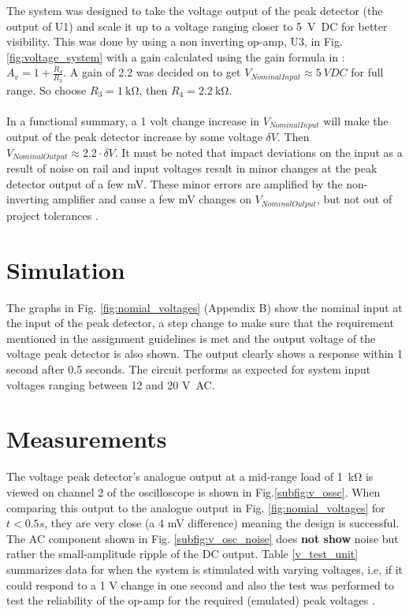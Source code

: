 The system was designed to take the voltage output of the peak detector (the output of U1) and scale it up to a voltage ranging closer to \SI{5}{\volt DC} for better visibility. This was done by using a non inverting op-amp, U3, in Fig. \ref{fig:voltage_system} with a gain calculated using the gain formula in \cite{non-inverting}: $A_v=1+\frac{R_4}{R_3} $.
A gain of 2.2 was decided on to get $V_{Nominal Input}\approx5\ VDC$ for full range. So choose $R_3=\SI{1}{\kilo\ohm}$, then $R_4=\SI{2.2}{\kilo\ohm}$.\\\\ 
In a functional summary, a 1 volt change increase in $V_{Nominal Input}$ will make the output of the peak detector increase by some voltage $\delta V$. Then $V_{Nominal Output} \approx2.2\cdot\delta V$.
It must be noted that impact deviations on the input as a result of noise on rail and input voltages result in minor changes at the peak detector output of a few mV. These minor errors are amplified by the non-inverting amplifier \cite{non-inverting} and cause a few mV changes on $V_{Nominal Output}$, but not out of project tolerances \cite{assignment_2}.

\section{Simulation} \label{sec:simulation_rectifier}
The graphs in Fig. \ref{fig:nomial_voltages} (Appendix B) show the nominal input at the input of the peak detector, a step change to make sure that the requirement mentioned in the assignment guidelines \cite{assignment_2} is met and the output voltage of the voltage peak detector is also shown. The output clearly shows a response within 1 second after 0.5 seconds. The circuit performs as expected for system input voltages ranging between 12 and 20 \si{\volt AC}.
 
\section{Measurements} \label{sec:measurements_voltage}

The voltage peak detector's analogue output at a mid-range load of \SI{1}{\kilo\ohm} is viewed on channel 2 of the oscilloscope is shown in Fig.\ref{subfig:v_ossc}. When comparing this output to the analogue output in Fig. \ref{fig:nomial_voltages} for $t<0.5s$, they are very close (a 4 mV difference) meaning the design is successful. The AC component shown in Fig. \ref{subfig:v_osc_noise} does \textbf{not show} noise but rather the small-amplitude ripple of the DC output. Table \ref{v_test_unit} summarizes data for when the system is stimulated with varying voltages, i.e, if it could respond to a 1 V change in one second and also the test was performed to test the reliability of the op-amp for the required (emulated) peak voltages \cite{assignment_2}.

